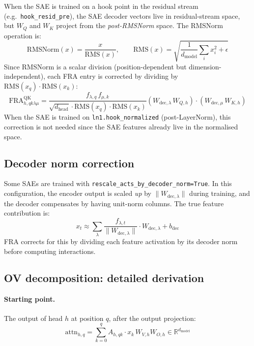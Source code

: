 \documentclass{article}
\theoremstyle{plain}
\theoremstyle{definition}
\theoremstyle{remark}
\newcommand{\WQ}{W_Q}
\newcommand{\WK}{W_K}
\newcommand{\dmodel}{d_{\mathrm{model}}}
\newcommand{\dhead}{d_{\mathrm{head}}}
\newcommand{\RR}{\mathbb{R}}
\begin{document}
When the SAE is trained on a hook point in the residual stream (e.g.\ \texttt{hook\_resid\_pre}), the SAE decoder vectors live in residual-stream space, but $\WQ$ and $\WK$ project from the \emph{post-RMSNorm} space. The RMSNorm operation is:
\begin{equation}
    \mathrm{RMSNorm}(x) = \frac{x}{\mathrm{RMS}(x)}, \qquad \mathrm{RMS}(x) = \sqrt{\frac{1}{\dmodel} \sum_i x_i^2 + \epsilon}
\end{equation}
Since RMSNorm is a scalar division (position-dependent but dimension-independent), each FRA entry is corrected by dividing by $\mathrm{RMS}(x_q) \cdot \mathrm{RMS}(x_k)$:
\begin{equation}
    \mathrm{FRA}^{\mathrm{QK}}_{h,qk\lambda\mu} = \frac{f_{\lambda,q} \, f_{\mu,k}}{\sqrt{\dhead} \cdot \mathrm{RMS}(x_q) \cdot \mathrm{RMS}(x_k)} \left( W_{\mathrm{dec},\lambda}\,W_{Q,h} \right) \cdot \left( W_{\mathrm{dec},\mu}\,W_{K,h} \right)
\end{equation}
When the SAE is trained on \texttt{ln1.hook\_normalized} (post-LayerNorm), this correction is not needed since the SAE features already live in the normalised space.

\subsection{Decoder norm correction}
\label{app:dec_norm}

Some SAEs are trained with \texttt{rescale\_acts\_by\_decoder\_norm=True}. In this configuration, the encoder output is scaled \emph{up} by $\|W_{\mathrm{dec},\lambda}\|$ during training, and the decoder compensates by having unit-norm columns. The true feature contribution is:
\begin{equation}
    x_t \approx \sum_\lambda \frac{f_{\lambda,t}}{\|W_{\mathrm{dec},\lambda}\|} \cdot W_{\mathrm{dec},\lambda} + b_{\mathrm{dec}}
\end{equation}
FRA corrects for this by dividing each feature activation by its decoder norm before computing interactions.

\subsection{OV decomposition: detailed derivation}
\label{app:ov_derivation}

\paragraph{Starting point.} The output of head $h$ at position $q$, after the output projection:
\begin{equation}
    \mathrm{attn}_{h,q} = \sum_{k=0}^{q} A_{h,qk} \cdot x_k\, W_{V,h} W_{O,h} \in \RR^{\dmodel}
\end{equation}
\end{document}

